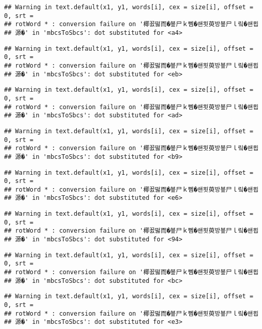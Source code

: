 \documentclass[]{article}
\begin{document}
\begin{verbatim}
## Warning in text.default(x1, y1, words[i], cex = size[i], offset = 0, srt =
## rotWord * : conversion failure on '椰꾨떯而�뵾尸ｋ뻼�쇈묏萸방뵾尸ｌ맄�쇈묍
## 源�' in 'mbcsToSbcs': dot substituted for <a4>
\end{verbatim}

\begin{verbatim}
## Warning in text.default(x1, y1, words[i], cex = size[i], offset = 0, srt =
## rotWord * : conversion failure on '椰꾨떯而�뵾尸ｋ뻼�쇈묏萸방뵾尸ｌ맄�쇈묍
## 源�' in 'mbcsToSbcs': dot substituted for <eb>
\end{verbatim}

\begin{verbatim}
## Warning in text.default(x1, y1, words[i], cex = size[i], offset = 0, srt =
## rotWord * : conversion failure on '椰꾨떯而�뵾尸ｋ뻼�쇈묏萸방뵾尸ｌ맄�쇈묍
## 源�' in 'mbcsToSbcs': dot substituted for <ad>
\end{verbatim}

\begin{verbatim}
## Warning in text.default(x1, y1, words[i], cex = size[i], offset = 0, srt =
## rotWord * : conversion failure on '椰꾨떯而�뵾尸ｋ뻼�쇈묏萸방뵾尸ｌ맄�쇈묍
## 源�' in 'mbcsToSbcs': dot substituted for <b9>
\end{verbatim}

\begin{verbatim}
## Warning in text.default(x1, y1, words[i], cex = size[i], offset = 0, srt =
## rotWord * : conversion failure on '椰꾨떯而�뵾尸ｋ뻼�쇈묏萸방뵾尸ｌ맄�쇈묍
## 源�' in 'mbcsToSbcs': dot substituted for <e6>
\end{verbatim}

\begin{verbatim}
## Warning in text.default(x1, y1, words[i], cex = size[i], offset = 0, srt =
## rotWord * : conversion failure on '椰꾨떯而�뵾尸ｋ뻼�쇈묏萸방뵾尸ｌ맄�쇈묍
## 源�' in 'mbcsToSbcs': dot substituted for <94>
\end{verbatim}

\begin{verbatim}
## Warning in text.default(x1, y1, words[i], cex = size[i], offset = 0, srt =
## rotWord * : conversion failure on '椰꾨떯而�뵾尸ｋ뻼�쇈묏萸방뵾尸ｌ맄�쇈묍
## 源�' in 'mbcsToSbcs': dot substituted for <bc>
\end{verbatim}

\begin{verbatim}
## Warning in text.default(x1, y1, words[i], cex = size[i], offset = 0, srt =
## rotWord * : conversion failure on '椰꾨떯而�뵾尸ｋ뻼�쇈묏萸방뵾尸ｌ맄�쇈묍
## 源�' in 'mbcsToSbcs': dot substituted for <e3>
\end{verbatim}
\end{document}
